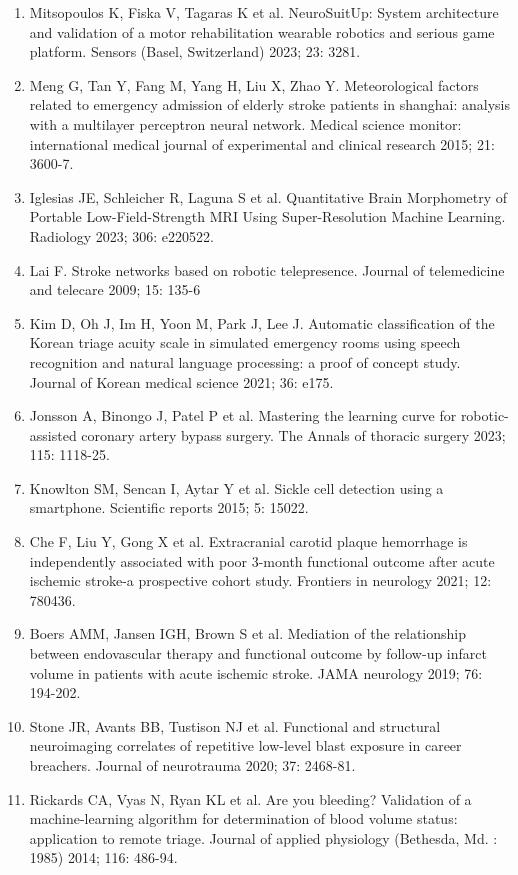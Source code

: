 {{\begin{enumerate}
    \item Mitsopoulos K, Fiska V, Tagaras K et al. NeuroSuitUp: System architecture and validation of a motor rehabilitation wearable robotics and serious game platform. Sensors (Basel, Switzerland) 2023; 23: 3281.
    \item Meng G, Tan Y, Fang M, Yang H, Liu X, Zhao Y. Meteorological factors related to emergency admission of elderly stroke patients in shanghai: analysis with a multilayer perceptron neural network. Medical science monitor: international medical journal of experimental and clinical research 2015; 21: 3600-7.
    \item Iglesias JE, Schleicher R, Laguna S et al. Quantitative Brain Morphometry of Portable Low-Field-Strength MRI Using Super-Resolution Machine Learning. Radiology 2023; 306: e220522.
    \item Lai F. Stroke networks based on robotic telepresence. Journal of telemedicine and telecare 2009; 15: 135-6
    \item Kim D, Oh J, Im H, Yoon M, Park J, Lee J. Automatic classification of the Korean triage acuity scale in simulated emergency rooms using speech recognition and natural language processing: a proof of concept study. Journal of Korean medical science 2021; 36: e175.
    \item Jonsson A, Binongo J, Patel P et al. Mastering the learning curve for robotic-assisted coronary artery bypass surgery. The Annals of thoracic surgery 2023; 115: 1118-25.
    \item Knowlton SM, Sencan I, Aytar Y et al. Sickle cell detection using a smartphone. Scientific reports 2015; 5: 15022.
    \item Che F, Liu Y, Gong X et al. Extracranial carotid plaque hemorrhage is independently associated with poor 3-month functional outcome after acute ischemic stroke-a prospective cohort study. Frontiers in neurology 2021; 12: 780436.
    \item Boers AMM, Jansen IGH, Brown S et al. Mediation of the relationship between endovascular therapy and functional outcome by follow-up infarct volume in patients with acute ischemic stroke. JAMA neurology 2019; 76: 194-202.
    \item Stone JR, Avants BB, Tustison NJ et al. Functional and structural neuroimaging correlates of repetitive low-level blast exposure in career breachers. Journal of neurotrauma 2020; 37: 2468-81.
    \item Rickards CA, Vyas N, Ryan KL et al. Are you bleeding? Validation of a machine-learning algorithm for determination of blood volume status: application to remote triage. Journal of applied physiology (Bethesda, Md. : 1985) 2014; 116: 486-94.

\end{enumerate}}}
